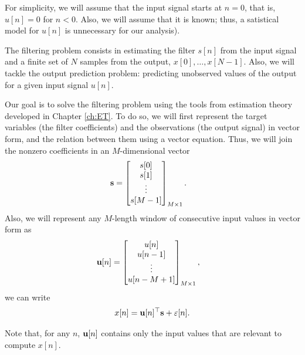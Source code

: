 For simplicity, we will assume that the input signal starts at $n=0$, that is, $u[n]=0$ for $n<0$. Also, we will assume that it is known; thus, a satistical model for $u[n]$ is unnecessary for our analysis).

The filtering problem consists in estimating the filter $s[n]$ from the input signal and a finite set of $N$ samples from the output, $x[0],\ldots, x[N-1]$. Also, we will tackle the output prediction problem: predicting unobserved values of the output for a given input signal $u[n]$.

Our goal is to solve the filtering problem using the tools from estimation theory developed in Chapter \ref{ch:ET}. To do so, we will first represent the target variables (the filter coefficients) and the observations (the output signal) in vector form, and the relation between them using a vector equation. Thus, we will join the nonzero coefficients in an $M$-dimensional vector
\begin{align}
{\mathbf s} &= \begin{bmatrix}
		s[0] \\ s[1] \\ \vdots \\ s[M-1]
      \end{bmatrix}_{M\times 1}.
\end{align}
Also, we will represent any $M$-length window of consecutive input values in vector form as
\begin{align}
{\mathbf u}[n] &= \begin{bmatrix}
   	    	  u[n] \\ u[n-1] \\ \vdots \\ u[n-M+1]
          \end{bmatrix}_{M\times 1},
\end{align}
we can write
\begin{equation}
\label{eq:signal_model}
x[n] = {\mathbf u}[n]^\top {\mathbf s} + \varepsilon[n].
\end{equation}

Note that, for any $n$, ${\mathbf u}[n]$ contains only the input values that are relevant to compute $x[n]$.

